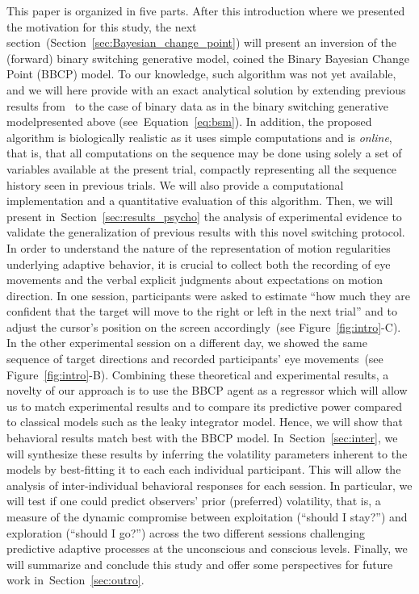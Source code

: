 \documentclass[10pt,letterpaper]{article}
\newcommand{\citet}[1]{\cite{#1}}
\newcommand{\seeFig}[1]{Figure~\ref{fig:#1}}
\newcommand{\seeEq}[1]{Equation~\ref{eq:#1}}
\newcommand{\seeSec}[1]{Section~\ref{sec:#1}}
\begin{document}
This paper is organized in five parts.
After this introduction where we presented the motivation for this study,
the next section~(\seeSec{Bayesian_change_point}) will present
an inversion of the (forward) binary switching generative model,
coined the Binary Bayesian Change Point (BBCP) model.
To our knowledge, such algorithm was not yet available, and
we will here provide with an exact analytical solution
by extending previous results from~\citet{AdamsMackay2007}
to the case of binary data as in the binary switching generative modelpresented above (see~\seeEq{bsm}).
In addition, the proposed algorithm is biologically realistic
as it uses simple computations and is \emph{online},
that is, that all computations on the sequence may be done
using solely a set of variables available at the present trial,
compactly representing all the sequence history seen in previous trials.
We will also provide a computational implementation
and a quantitative evaluation of this algorithm.
Then, we will present in~\seeSec{results_psycho} the analysis of experimental evidence
to validate the generalization of previous results %
with this novel switching protocol.
In order to understand the nature of
the representation of motion regularities underlying adaptive behavior,
it is crucial to collect both
the recording of eye movements
and the verbal explicit judgments about expectations on motion direction.
In one session, participants were asked to estimate
``how much they are confident that
the target will move to the right or left in the next trial'' and
to adjust the cursor's position on the screen accordingly~(see \seeFig{intro}-C).
In the other experimental session on a different day,
we showed the same sequence of target directions and
recorded participants' eye movements~(see \seeFig{intro}-B).
Combining these theoretical and experimental results,
a novelty of our approach is to use the BBCP agent as a regressor
which will allow us to match experimental results
and to compare its predictive power compared to classical models such as the leaky integrator model.
Hence, we will show that behavioral results match best with the BBCP model.
In~\seeSec{inter}, we will synthesize these results
by inferring the volatility parameters inherent to the models
by best-fitting it to each each individual participant.
This will allow the analysis of inter-individual behavioral responses for each session.
In particular, we will test if one could predict observers' prior (preferred) volatility,
that is, a measure of the dynamic compromise between
exploitation (``should I stay?'') and exploration (``should I go?'')
across the two different sessions challenging predictive adaptive processes
at the unconscious and conscious levels.
Finally, we will summarize and conclude this study and
offer some perspectives for future work in~\seeSec{outro}.
%
\end{document}
